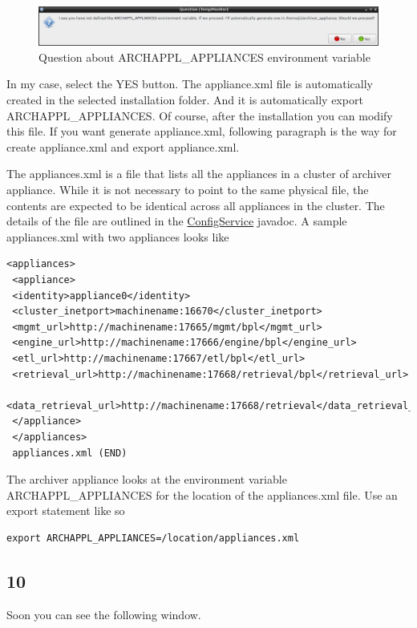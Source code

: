 \documentclass[11pt
  , a4paper
  , article
  , oneside
]{memoir}
\begin{document}
\begin{figure}[h!]
	\centering
	\includegraphics[width=1\textwidth, height=0.2\textwidth]{./images/4.png}
	\caption{Question about ARCHAPPL\_APPLIANCES environment variable}
\end{figure}

In my case, select the YES button. The appliance.xml file is automatically created in the selected installation folder. And it is automatically export ARCHAPPL\_APPLIANCES. Of course, after the installation you can modify this file. If you want generate appliance.xml, following paragraph is the way for create appliance.xml and export appliance.xml.

The appliances.xml is a file that lists all the appliances in a cluster of archiver appliance. While it is not necessary to point to the same physical file, the contents are expected to be identical across all appliances in the cluster. The details of the file are outlined in the \href{http://slacmshankar.github.io/epicsarchiver_docs/api/org/epics/archiverappliance/config/ConfigService.html#ARCHAPPL_APPLIANCES}{ConfigService} javadoc. A sample appliances.xml with two appliances looks like
\begin{lstlisting}[style=termstyle]
 <appliances>
 <appliance>
 <identity>appliance0</identity>
 <cluster_inetport>machinename:16670</cluster_inetport>
 <mgmt_url>http://machinename:17665/mgmt/bpl</mgmt_url>
 <engine_url>http://machinename:17666/engine/bpl</engine_url>
 <etl_url>http://machinename:17667/etl/bpl</etl_url>
 <retrieval_url>http://machinename:17668/retrieval/bpl</retrieval_url>
 <data_retrieval_url>http://machinename:17668/retrieval</data_retrieval_url>
 </appliance>
 </appliances>
 appliances.xml (END)
\end{lstlisting}
The archiver appliance looks at the environment variable ARCHAPPL\_APPLIANCES for the location of the appliances.xml file. Use an export statement like so
\begin{lstlisting}[style=termstyle]
export ARCHAPPL_APPLIANCES=/location/appliances.xml
\end{lstlisting}
\subsection{10}
Soon you can see the following window.
\end{document}
